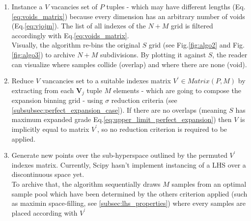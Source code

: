 \documentclass[12pt]{article}
\newcommand{\meqref}[1]{Eq.\ref{#1}}
\newcommand{\mfigref}[1]{Fig.\ref{#1}}
\begin{document}
\begin{enumerate}
\item Instance a $V$ vacancies set of $P$ tuples - which may have different lengths (\meqref{eq:voids_matrix}) because every dimension has an arbitrary number of voids (\meqref{eq:vjojm}). The list of all indexes of the $N+M$ grid is filtered accordingly with \meqref{eq:voids_matrix}. \\ 
Visually, the algorithm re-bins the original $S$ grid (see \mfigref{fig:algo2} and \mfigref{fig:algo3}) to archive $N+M$ subdivisions. By plotting it against $S$, the reader can visualize where samples collide (overlap) and where there are none (void).

\item Reduce $V$ vancancies set to a suitable indexes matrix $V^\prime \in Matrix(P, M)$ by extracting from each $\textbf{V}_j$ tuple $M$ elements - which are going to compose the expansion binning grid - using $\sigma$ reduction criteria (see \cref{subsubsec:perfect_expansion_case}). If there are no overlaps (meaning $S$ has maximum expanded grade \meqref{eq:upper_limit_perfect_expansion}) then $V$ is implicitly equal to matrix $V^\prime$, so no reduction criterion is required to be applied.

\item Generate new points over the sub-hyperspace outlined by the permuted $V^\prime$ indexes matrix. Currently, Scipy hasn't implement instancing of a LHS over a discontinuous space yet.\\ 
To archive that, the algorithm sequentially draws $M$ samples from an optimal sample pool which have been determined by the others criterion applied (such as maximin space-filling, see \cref{subsec:lhs_properties}) where every samples are placed according with $V^\prime$
\end{enumerate}


%		
		
\end{document}
